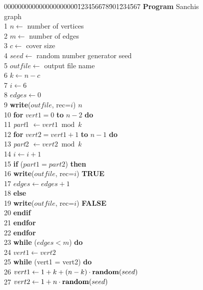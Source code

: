 \begin{figure}
{\footnotesize
\begin{tabbing}
00000000000000000000\=0\=123\=456\=678\=901\=234\=567\= \+ \+ \kill
 \< {\bf Program} Sanchis graph \\
 1 \> $n \leftarrow$ number of vertices\\
 2 \> $m \leftarrow$ number of edges \\
 3 \> $c \leftarrow$ cover size \\
 4 \> $seed \leftarrow$ random number generator seed \\
 5 \> $outfile \leftarrow$ output file name \\
 6 \> $k \leftarrow n-c$ \\
 7 \> $i \leftarrow 6$ \\
 8 \> $edges \leftarrow 0$ \\
 9 \> {\bf write}($outfile$, rec=$i$)  $n$ \- \\
10 \> \> {\bf for} $vert1 = 0$ {\bf to} $n-2$ {\bf do} \\
11 \> \> \> {\em part\/}1 $\leftarrow {vert1 \bmod k}$ \\
12 \> \> \> {\bf for} $vert2 = vert1+1$ {\bf to} $n-1$ {\bf do} \\
13 \> \> \> \> {\em part\/}2 $\leftarrow {vert2 \bmod k}$ \\
14 \> \> \> \> $i \leftarrow i+1$ \\
15 \> \> \> \> {\bf if} ($part1 = part2$) {\bf then} \\
16 \> \> \> \> \> {\bf write}($outfile$, rec=$i$) {\bf TRUE} \\
17 \> \> \> \> \> $edges \leftarrow  edges+1$ \\
18 \> \> \> \> {\bf else} \\
19 \> \> \> \> \> {\bf write}($outfile$, rec=$i$) {\bf FALSE} \\
20 \> \> \> \> {\bf endif} \\
21 \> \> \> {\bf endfor} \\
22 \> \> {\bf endfor} \\
23 \> \> {\bf while} ($edges < m$) {\bf do} \\
24 \> \> \> $vert1 \leftarrow vert2$ \\
25 \> \> \> {\bf while} (vert1 = vert2) {\bf do} \\
26 \> \> \> \> $vert1 \leftarrow 1+k+(n-k)\cdot{\bf random}(seed)$ \\
27 \> \> \> \> $vert2 \leftarrow 1+n\cdot{\bf random}(seed)$ \\

\end{tabbing}}
\end{figure}
